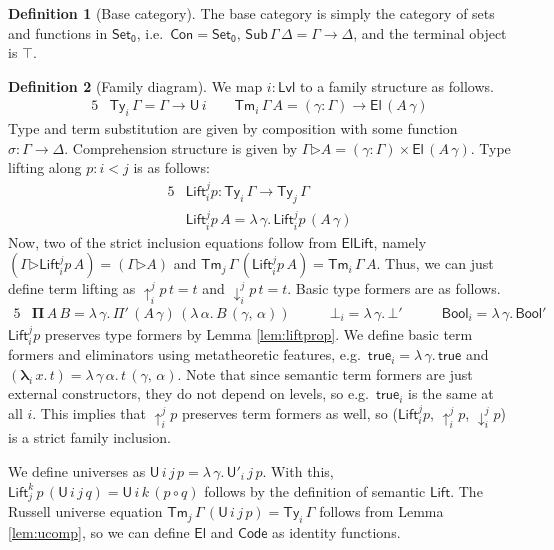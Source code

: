 \documentclass[a4paper,UKenglish,cleveref, autoref, thm-restate]{lipics-v2021}
\theoremstyle{remark}
\theoremstyle{definition}
\newtheorem{mydefinition}{Definition}
\newcommand{\Set}[1]{\mathsf{Set_{#1}}}
\newcommand{\Con}{\mathsf{Con}}
\newcommand{\Ty}{\mathsf{Ty}}
\newcommand{\Tm}{\mathsf{Tm}}
\newcommand{\Sub}{\mathsf{Sub}}
\newcommand{\U}{\mathsf{U}}
\newcommand{\El}{\mathsf{El}}
\newcommand{\ext}{\triangleright}
\newcommand{\Bool}{\mathsf{Bool}}
\newcommand{\true}{\mathsf{true}}
\newcommand{\up}{{\uparrow}}
\newcommand{\down}{{\downarrow}}
\newcommand{\Lift}{\mathsf{Lift}}
\newcommand{\Lvl}{\mathsf{Lvl}}
\renewcommand{\U}{\mathsf{U}}
\newcommand{\Code}{\mathsf{Code}}
\newcommand{\msf}[1]{\mathsf{#1}}
\begin{document}
\begin{mydefinition}[Base category]
The base category is simply the category of sets and functions in $\Set0$, i.e.\ $\bm{\Con} =
\Set0$, $\bm{\Sub}\,\Gamma\,\Delta = \Gamma \to \Delta$, and the terminal object is $\top$.
\end{mydefinition}

\begin{mydefinition}[Family diagram]
We map $i : \Lvl$ to a family structure as follows.
\begin{alignat*}{5}
  &\bm{\Ty}_i\,\Gamma = \Gamma \to \U\,i \hspace{2em} \bm{\Tm}_i\,\Gamma\,A = (\gamma : \Gamma) \to \El\,(A\,\gamma)
\end{alignat*}
Type and term substitution are given by composition with some function $\sigma : \Gamma
\to \Delta$. Comprehension structure is given by $\Gamma \bm{\ext} A =
(\gamma : \Gamma) \times \El\,(A\,\gamma)$. Type lifting along $p : i < j$ is
as follows:
\begin{alignat*}{5}
  & \bm{\Lift}_{i}^{j}p : \bm{\Ty}_i\,\Gamma \to \bm{\Ty}_j\,\Gamma\\
  & \bm{\Lift}_{i}^{j}p\,A = \lambda\,\gamma.\,\Lift_{i}^{j}p\,(A\,\gamma)
\end{alignat*}
Now, two of the strict inclusion equations follow from $\msf{ElLift}$, namely
$(\Gamma \bm{\ext} \bm{\Lift}_{i}^{j}p\,A) = (\Gamma \bm{\ext} A)$ and
$\bm{\Tm}_j\,\Gamma\,(\bm{\Lift}_{i}^{j}p\,A) = \bm{\Tm}_i\,\Gamma\,A$. Thus, we
can just define term lifting as $\bm{\up}_{i}^{j}\!p\,t = t$ and
$\bm{\down}_{i}^{j}\!p\,t = t$. Basic type formers are as follows.
\begin{alignat*}{5}
  & \bm{\Pi}\,A\,B = \lambda\,\gamma.\,\Pi'\,(A\,\gamma)\,(\lambda\,\alpha.\,B\,(\gamma,\,\alpha))
  & \hspace{2em}\bm{\bot}_i = \lambda\,\gamma.\,\bot'
  & \hspace{2em}\bm{\Bool}_i = \lambda\,\gamma.\,\Bool'
\end{alignat*}
$\bm{\Lift}_{i}^{j}p$ preserves type formers by Lemma \ref{lem:liftprop}. We
define basic term formers and eliminators using metatheoretic features, e.g.\ $\bm{\true}_i
= \lambda\,\gamma.\,\true$ and $(\bm{\lambda}_i\,x.\,t) =
\lambda\,\gamma\,\alpha.\,t\,(\gamma,\,\alpha)$. Note that since semantic term
formers are just external constructors, they do not depend on levels, so
e.g.\ $\bm{\true}_i$ is the same at all $i$. This implies that
$\bm{\up}_{i}^{j}\!p$ preserves term formers as well, so ($\bm{\Lift}_{i}^{j}p$,
$\bm{\up}_{i}^{j}\!p$, $\bm{\down}_{i}^{j}\!p$) is a strict family inclusion.

We define universes as $\bm{\U}\,i\,j\,p = \lambda\,\gamma.\,\U'_i\,j\,p$.  With
this, $\bm{\Lift}_{j}^{k}\,p\,(\bm{\U}\,i\,j\,q) = \bm{\U}\,i\,k\,(p \circ q)$
follows by the definition of semantic $\Lift$. The Russell universe equation
$\bm{\Tm}_j\,\Gamma\,(\bm{\U}\,i\,j\,p) = \bm{\Ty}_i\,\Gamma$ follows from Lemma
\ref{lem:ucomp}, so we can define $\bm{\El}$ and $\bm{\Code}$ as identity functions.

\end{mydefinition}
\end{document}
